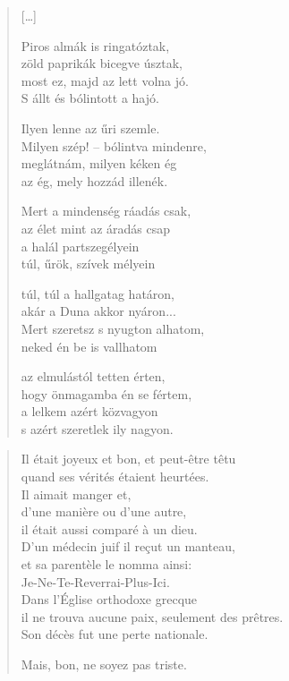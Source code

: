 \documentclass[11pt]{book}
\newcommand*{\centeredornament}{\centerline{\pgfornament[width=6cm]{88}}}
\begin{document}
\begin{verse}
  \textnormal{[\ldots]}

  Piros almák is ringatóztak, \\
  zöld paprikák bicegve úsztak, \\
  most ez, majd az lett volna jó. \\
  S állt és bólintott a hajó.

  Ilyen lenne az űri szemle. \\
  Milyen szép! -- bólintva mindenre, \\
  meglátnám, milyen kéken ég \\
  az ég, mely hozzád illenék.

  Mert a mindenség ráadás csak, \\
  az élet mint az áradás csap \\
  a halál partszegélyein \\
  túl, űrök, szívek mélyein

  túl, túl a hallgatag határon, \\
  akár a Duna akkor nyáron... \\
  Mert szeretsz s nyugton alhatom, \\
  neked én be is vallhatom

  az elmulástól tetten érten, \\
  hogy önmagamba én se fértem, \\
  a lelkem azért közvagyon \\
  s azért szeretlek ily nagyon.
\end{verse}

\newpage

\vspace*{-15mm}
\centeredornament



\begin{verse}
  Il était joyeux et bon, et peut-être têtu \\
  quand ses vérités étaient heurtées. \\
  Il aimait manger et, \\
  d'une manière ou d'une autre, \\
  il était aussi comparé à un dieu. \\
  D'un médecin juif il reçut un manteau, \\
  et sa parentèle le nomma ainsi: \\
  Je-Ne-Te-Reverrai-Plus-Ici. \\
  Dans l'Église orthodoxe grecque \\
  il ne trouva aucune paix, seulement des prêtres.\hspace*{-1mm} \\
  Son décès fut une perte nationale.

  Mais, bon, ne soyez pas triste.
\end{verse}
\end{document}
